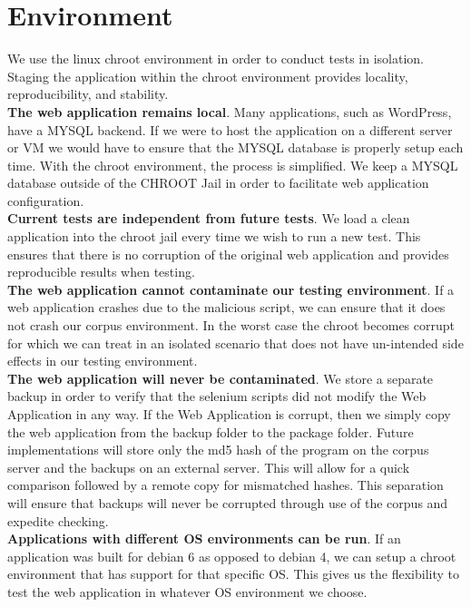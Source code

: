 \documentclass[letterpaper,twocolumn,10pt]{article}
\begin{document}
\section{Environment}

We use the linux chroot environment in order to conduct tests in isolation.  Staging the application within the chroot environment provides locality, reproducibility, and stability.\\

{\bf The web application remains local}.  Many applications, such as WordPress, have a MYSQL backend.  If we were to host the application on a different server or VM we would have to ensure that the MYSQL database is properly setup each time.  With the chroot environment, the process is simplified. We keep a MYSQL database outside of the CHROOT Jail in order to facilitate web application configuration.  \\

{\bf Current tests are independent from future tests}.  We load a clean application into the chroot jail every time we wish to run a new test.  This ensures that there is no corruption of the original web application and provides reproducible results when testing.\\

{\bf The web application cannot contaminate our testing environment}.  If a web application crashes due to the malicious script, we can ensure that it does not crash our corpus environment.  In the worst case the chroot becomes corrupt for which we can treat in an isolated scenario that does not have un-intended side effects in our testing environment.  \\

{\bf The web application will never be contaminated}.  We store a separate backup in order to verify that the selenium scripts did not modify the Web Application in any way.  If the Web Application is corrupt, then we simply copy the web application from the backup folder to the package folder.  Future implementations will store only the md5 hash of the program on the corpus server and the backups on an external server.  This will allow for a quick comparison followed by a remote copy for mismatched hashes.  This separation will ensure that backups will never be corrupted through use of the corpus and expedite checking.  \\

{\bf Applications with different OS environments can be run}.  If an application was built for debian 6 as opposed to debian 4, we can setup a chroot environment that has support for that specific OS.  This gives us the flexibility to test the web application in whatever OS environment we choose.
\end{document}
